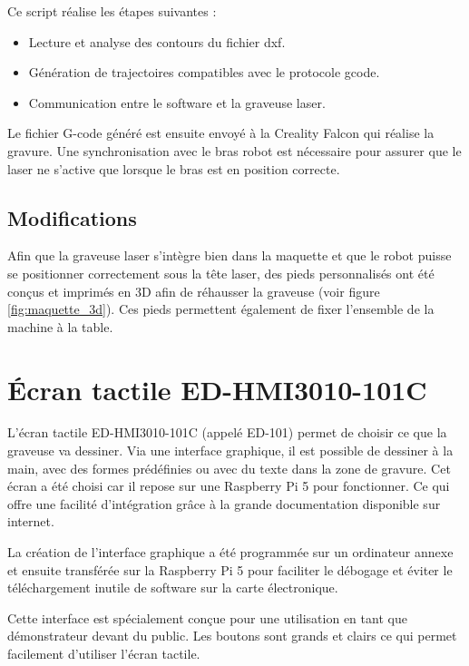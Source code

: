Ce script réalise les étapes suivantes :
\begin{itemize}
    \item Lecture et analyse des contours du fichier \gls{dxf}.
    \item Génération de trajectoires compatibles avec le protocole \gls{gcode}.
    \item Communication entre le \gls{software} et la graveuse laser.
\end{itemize}

Le fichier G-code généré est ensuite envoyé à la Creality Falcon qui réalise la gravure. Une synchronisation avec le bras robot est nécessaire pour assurer que le laser ne s'active que lorsque le bras est en position correcte.

\subsection{Modifications}

Afin que la graveuse laser s'intègre bien dans la maquette et que le robot puisse se positionner correctement sous la tête laser, des pieds personnalisés ont été conçus et imprimés en 3D afin de réhausser la graveuse (voir figure \ref{fig:maquette_3d}). Ces pieds permettent également de fixer l'ensemble de la machine à la table.

\section{Écran tactile ED-HMI3010-101C}

L’écran tactile \gls{ED-HMI3010-101C} \cite{ED-101} (appelé ED-101) permet de choisir ce que la graveuse va dessiner. Via une interface graphique, il est possible de dessiner à la main, avec des formes prédéfinies ou avec du texte dans la zone de gravure.
Cet écran a été choisi car il repose sur une Raspberry Pi 5 pour fonctionner. Ce qui offre une facilité d'intégration grâce à la grande documentation disponible sur internet.

La création de l'interface graphique a été programmée sur un ordinateur annexe et ensuite transférée sur la Raspberry Pi 5 pour faciliter le débogage et éviter le téléchargement inutile de \gls{software} sur la carte électronique.

Cette interface est spécialement conçue pour une utilisation en tant que démonstrateur devant du public. Les boutons sont grands et clairs ce qui permet facilement d'utiliser l'écran tactile.

